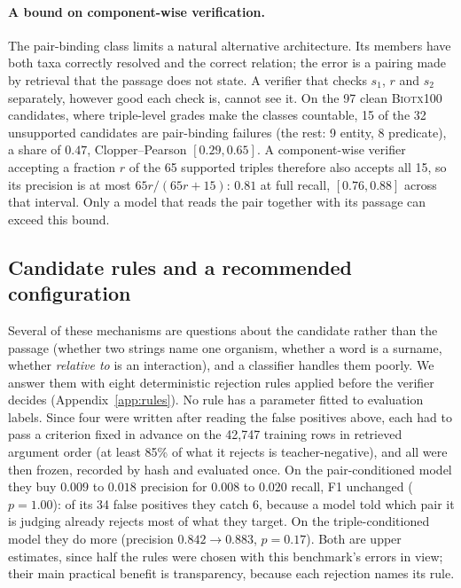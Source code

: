 \documentclass[11pt]{article}
\begin{document}
\paragraph{A bound on component-wise verification.}
The pair-binding class limits a natural alternative architecture. Its members have both taxa
correctly resolved and the correct relation; the error is a pairing made by retrieval that the passage does not state. A verifier
that checks $s_1$, $r$ and $s_2$ separately, however good each check is, cannot see it. On the 97
clean \textsc{Biotx100} candidates, where triple-level grades make the classes countable, 15 of the
32 unsupported candidates are pair-binding failures (the rest: 9 entity, 8 predicate), a share of
$0.47$, Clopper--Pearson $[0.29, 0.65]$. A component-wise verifier accepting a fraction $r$ of the
65 supported triples therefore also accepts all 15, so its precision is at most $65r/(65r+15)$:
$0.81$ at full recall, $[0.76, 0.88]$ across that interval. Only a model that reads the pair together with its passage can exceed this bound.

\subsection{Candidate rules and a recommended configuration}
\label{sec:rules}

Several of these mechanisms are questions about the candidate rather than the passage (whether two
strings name one organism, whether a word is a surname, whether \emph{relative to} is an
interaction), and a classifier handles them poorly. We answer them with eight
deterministic rejection rules applied before the verifier decides (Appendix~\ref{app:rules}). No rule has a parameter fitted to evaluation labels. Since four were written after reading the false
positives above, each had to pass a criterion fixed in advance on the 42{,}747 training rows in retrieved argument order (at
least 85\% of what it rejects is teacher-negative), and all were then frozen, recorded by hash and
evaluated once. On the pair-conditioned model they buy $0.009$ to $0.018$ precision for $0.008$ to
$0.020$ recall, F1 unchanged ($p = 1.00$): of its 34 false positives they catch 6, because a model
told which pair it is judging already rejects most of what they target. On the triple-conditioned
model they do more (precision $0.842 \to 0.883$, $p = 0.17$). Both are upper estimates, since half
the rules were chosen with this benchmark's errors in view; their main practical benefit is transparency, because each rejection names its rule.
\end{document}
